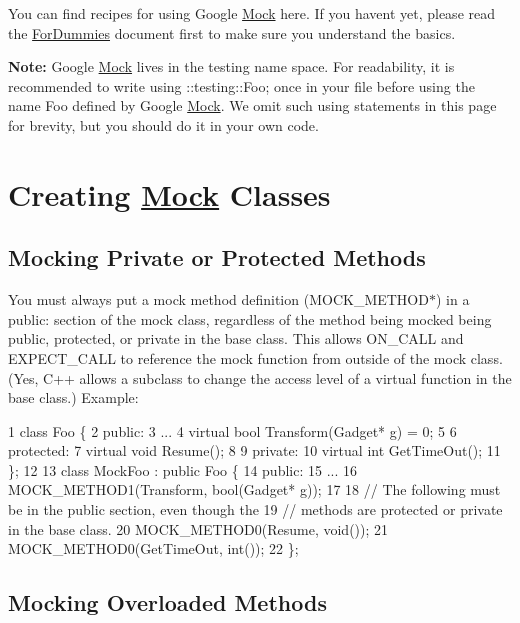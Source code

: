 You can find recipes for using Google \hyperlink{class_mock}{Mock} here. If you haven\textquotesingle{}t yet, please read the \hyperlink{v1__7_2_for_dummies_8md}{For\+Dummies} document first to make sure you understand the basics.

{\bfseries Note\+:} Google \hyperlink{class_mock}{Mock} lives in the {\ttfamily testing} name space. For readability, it is recommended to write {\ttfamily using \+::testing\+::\+Foo;} once in your file before using the name {\ttfamily Foo} defined by Google \hyperlink{class_mock}{Mock}. We omit such {\ttfamily using} statements in this page for brevity, but you should do it in your own code.

\section*{Creating \hyperlink{class_mock}{Mock} Classes}

\subsection*{Mocking Private or Protected Methods}

You must always put a mock method definition ({\ttfamily M\+O\+C\+K\+\_\+\+M\+E\+T\+H\+O\+D$\ast$}) in a {\ttfamily public\+:} section of the mock class, regardless of the method being mocked being {\ttfamily public}, {\ttfamily protected}, or {\ttfamily private} in the base class. This allows {\ttfamily O\+N\+\_\+\+C\+A\+LL} and {\ttfamily E\+X\+P\+E\+C\+T\+\_\+\+C\+A\+LL} to reference the mock function from outside of the mock class. (Yes, C++ allows a subclass to change the access level of a virtual function in the base class.) Example\+:


\begin{DoxyCode}
1 class Foo \{
2  public:
3   ...
4   virtual bool Transform(Gadget* g) = 0;
5 
6  protected:
7   virtual void Resume();
8 
9  private:
10   virtual int GetTimeOut();
11 \};
12 
13 class MockFoo : public Foo \{
14  public:
15   ...
16   MOCK\_METHOD1(Transform, bool(Gadget* g));
17 
18   // The following must be in the public section, even though the
19   // methods are protected or private in the base class.
20   MOCK\_METHOD0(Resume, void());
21   MOCK\_METHOD0(GetTimeOut, int());
22 \};
\end{DoxyCode}


\subsection*{Mocking Overloaded Methods}

